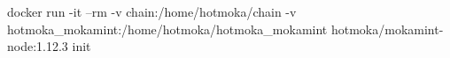 \begin{shellcommandbox}\begin{ttlst}
docker run -it --rm -v chain:/home/hotmoka/chain -v hotmoka_mokamint:/home/hotmoka/hotmoka_mokamint hotmoka/mokamint-node:1.12.3 init
\end{ttlst}\end{shellcommandbox}
